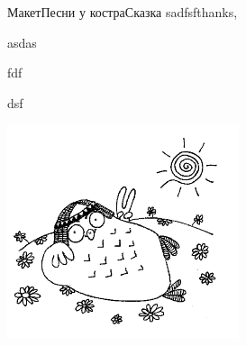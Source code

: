 \documentclass[11pt,a5paper]{book}
\renewcommand{\footrulewidth}{0.0pt}
\renewcommand{\footrulewidth}{0pt}
\renewcommand{\footrulewidth}{0.0pt}
\begin{document}
\begin{song}{Макет}{}{Песни у костра}{Сказка}{}{}
sadfsfthanks,\par
\begin{SBOpGroup}
asdas\
\end{SBOpGroup}
\begin{SBSection*}fdf\end{SBSection*}
\begin{SBVerse*}\end{SBVerse*}
\begin{SBChorus*}\end{SBChorus*}

\begin{SBOccurs}{23}
dsf
\end{SBOccurs}

\begin{SBSection*}
\begin{figure}[b!]
\end{figure}
\end{SBSection*}
\end{song}

\mainmatter

\renewcommand{\footrulewidth}{0.0pt}
\renewcommand{\item}{\par\hangindent=40pt}
\renewcommand{\subitem}{\par\hangindent=40pt \hspace*{20pt}}
\renewcommand{\subsubitem}{\par\hangindent=40pt \hspace*{30pt}}

\newpage
\raggedright

\centering\includegraphics[scale=0.5]{10}
\end{document}
